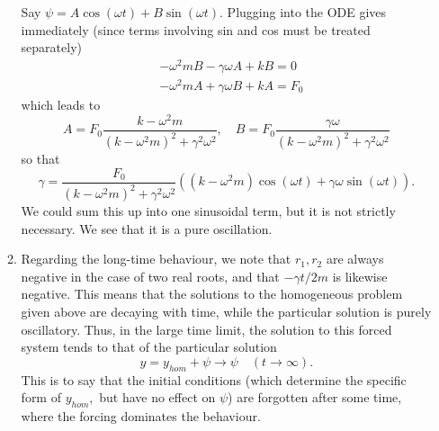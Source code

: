 \documentclass[10pt,a4paper]{letter}
\begin{document}
\begin{enumerate}
\begin{enumerate}
Say $\psi = A \cos(\omega t) + B \sin(\omega t).$ Plugging into the ODE gives immediately (since terms involving sin and cos must be treated separately)
\begin{align*}
& - \omega^2 m B - \gamma \omega A + k B = 0 \\
& - \omega^2 m A + \gamma \omega B + kA = F_0
\end{align*} 
which leads to 
\[ A = F_0 \frac{k-\omega^2 m}{(k-\omega^2 m)^2 + \gamma^2 \omega^2}, \quad B = F_0 \frac{\gamma \omega}{(k-\omega^2 m)^2 + \gamma^2 \omega^2} \]
so that 
\[ \gamma = \frac{F_0}{(k-\omega^2 m)^2 + \gamma^2 \omega^2} \left( (k-\omega^2 m) \cos(\omega t) + \gamma \omega \sin(\omega t) \right). \]
We could sum this up into one sinusoidal term, but it is not strictly necessary. We see that it is a pure oscillation.
\item Regarding the long-time behaviour, we note that $r_1, r_2$ are always negative in the case of two real roots, and that $-\gamma t/2m$ is likewise negative. This means that the solutions to the homogeneous problem given above are decaying with time, while the particular solution is purely oscillatory. Thus, in the large time limit, the solution to this forced system tends to that of the particular solution
\[ y = y_{hom} + \psi \rightarrow \psi \quad  (t \rightarrow \infty). \]
This is to say that the initial conditions (which determine the specific form of $y_{hom},$ but have no effect on $\psi$) are forgotten after some time, where the forcing dominates the behaviour. 


\end{enumerate}
\end{enumerate}
\end{document}
